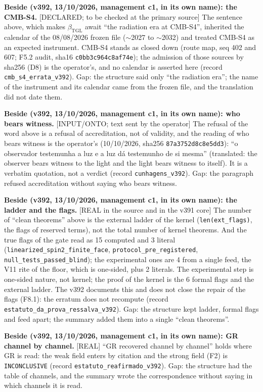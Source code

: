 \documentclass[11pt]{article}
\theoremstyle{definition}\newtheorem{deriv}{Derivation}
\begin{document}
\textbf{Beside (v392, 13/10/2026, management c1, in its own name): the CMB-S4.} \textsf{[DECLARED; to be checked at the primary source]} The sentence above, which makes $\beta_{\mathrm{TGL}}$ await ``the radiation era at CMB-S4'', inherited the calendar of the 08/08/2026 frozen file ($\sim$2027 to $\sim$2032) and treated CMB-S4 as an expected instrument. CMB-S4 stands as closed down (route map, seq 402 and 607; F5.2 audit, sha16 \texttt{c0bb3c964c8af74e}); the admission of those sources by sha256 (D8) is the operator's, and no calendar is asserted here (record \texttt{cmb\_s4\_errata\_v392}). Gap: the structure said only ``the radiation era''; the name of the instrument and its calendar came from the frozen file, and the translation did not date them.

\textbf{Beside (v392, 13/10/2026, management c1, in its own name): who bears witness.} \textsf{[INPUT/ONTO; text sent by the operator]} The refusal of the word above is a refusal of accreditation, not of validity, and the reading of who bears witness is the operator's (10/10/2026, sha256 \texttt{87a3752d8c8e5dd3}): ``o observador testemunha a luz e a luz dá testemunho de si mesma'' (translated: the observer bears witness to the light and the light bears witness to itself). It is a verbatim quotation, not a verdict (record \texttt{cunhagens\_v392}). Gap: the paragraph refused accreditation without saying who bears witness.

\textbf{Beside (v392, 13/10/2026, management c1, in its own name): the ladder and the flags.} \textsf{[REAL in the source and in the v391 core]} The number of ``clean theorems'' above is the external ladder of the kernel (\texttt{len(ext\_flags)}, the flags of reserved terms), not the total number of kernel theorems. And the true flags of the gate read as 15 computed and 3 literal (\texttt{linearized\_spin2\_finite\_face}, \texttt{protocol\_pre\_registered}, \texttt{null\_tests\_passed\_blind}); the experimental ones are 4 from a single feed, the V11 rite of the floor, which is one-sided, plus 2 literals. The experimental step is one-sided nature, not kernel; the proof of the kernel is the 6 formal flags and the external ladder. The v392 documents this and does not close the repair of the flags (F8.1): the erratum does not recompute (record \texttt{estatuto\_da\_prova\_ressalva\_v392}). Gap: the structure kept ladder, formal flags and feed apart; the summary added them into a single ``clean theorems''.

\textbf{Beside (v392, 13/10/2026, management c1, in its own name): GR channel by channel.} \textsf{[REAL]} ``GR recovered channel by channel'' holds where GR is read: the weak field enters by citation and the strong field (F2) is \texttt{INCONCLUSIVE} (record \texttt{estatuto\_reafirmado\_v392}). Gap: the structure had the table of channels, and the summary wrote the correspondence without saying in which channels it is read.
\end{document}
